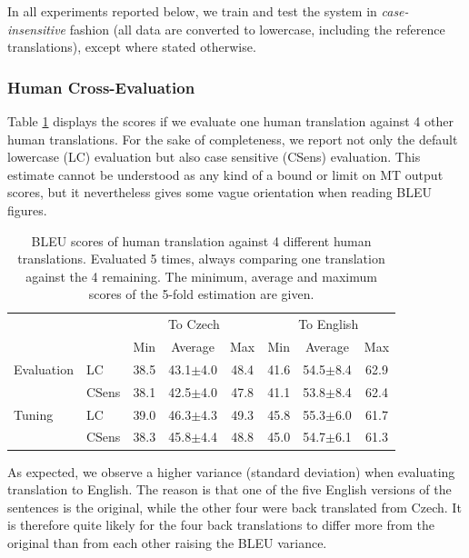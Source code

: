 \documentclass[11pt]{report}
\theoremstyle{plain}
\begin{document}
{{In all experiments reported below, we train and test the system in
\emph{case-insensitive} fashion (all data are converted to lowercase, including
the reference translations), except where stated otherwise.



\subsubsection{Human Cross-Evaluation}

Table \ref{crosseval} displays the scores if we evaluate one human translation
against 4 other human translations. For the sake of completeness, we report not
only the default lowercase (LC) evaluation but also case sensitive (CSens)
evaluation. This estimate cannot be understood as any kind of a bound or limit
on MT output scores, but it nevertheless gives some vague orientation when
reading BLEU figures.

\begin{table}[ht]
\begin{center}
\begin{tabular}{llccc|ccc}
   &     &  \multicolumn{3}{c}{To Czech}   &  \multicolumn{3}{c}{To English}\\
  &    &  Min  &  Average  &  Max  &  Min  &  Average  &  Max\\
\hline
Evaluation   &  LC   &  38.5  &  43.1$\pm$4.0  &  48.4   &  41.6  &  54.5$\pm$8.4  &  62.9\\
   &  CSens  &  38.1  &  42.5$\pm$4.0  &  47.8   &  41.1  &  53.8$\pm$8.4  &  62.4\\
\hline
Tuning   &  LC   &  39.0  &  46.3$\pm$4.3  &  49.3   &  45.8  &  55.3$\pm$6.0  &  61.7\\
   &  CSens  &  38.3  &  45.8$\pm$4.4  &  48.8   &  45.0  &  54.7$\pm$6.1  &  61.3\\
\end{tabular}
\end{center}
\caption{BLEU scores of human translation against 4 different human
translations. Evaluated 5 times, always comparing one translation against the 4
remaining. The minimum, average and maximum scores of the 5-fold estimation are
given.}
\label{crosseval}
\end{table}

As expected, we observe a higher variance (standard deviation) when evaluating
translation to English. The reason is that one of the five English versions of
the sentences is the original, while the other four were back translated
from Czech. It is therefore quite likely for the four back translations to differ
more from the original than from each other raising the BLEU variance.

}}
\end{document}
